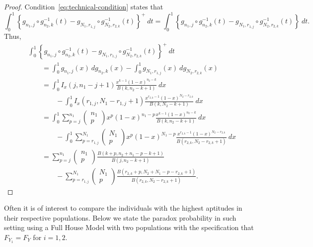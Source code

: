 \documentclass[12pt]{article}
\begin{document}
\begin{proof}
Condition~\eqref{eq:technical-condition} states that 
$$
\int_0^1 \left\{g_{n_1, j} \circ g_{n_2, k}^{-1}(t) - g_{N_1, r_{1,j}} \circ g_{N_2, r_{2,k}}^{-1}(t)\right\}^+\ dt = 
\int_0^1 \left\{g_{n_1, j} \circ g_{n_2, k}^{-1}(t) - g_{N_1, r_{1,j}} \circ g_{N_2, r_{2,k}}^{-1}(t)\right\}\ dt.
$$
Thus,
\begin{align*}	
&\int_0^1 \left\{g_{n_1, j} \circ g_{n_2, k}^{-1}(t) - g_{N_1, r_{1,j}} \circ g_{N_2, r_{2,k}}^{-1}(t)\right\}^+\ dt \\
	&\qquad= \int_0^1 g_{n_1, j}(x) \ dg_{n_2, k}(x)- \int_0^1g_{N_1, r_{1,j}}(x) \ dg_{N_2, r_{2,k}}(x)\\
	&\qquad= \int_0^1 I_x(j, n_1 -j+1) \frac{x^{k-1}(1-x)^{n_2-k}}{B(k, n_2-k+1)} \ dx \\ 
	&\qquad\qquad- \int_0^1 I_x(r_{1,j}, N_1-r_{1,j}+1) \frac{x^{r_{2,k}-1}(1-x)^{N_2-r_{2,k}}}{B(k, N_2-k+1)} \ dx\\
	&\qquad =\int_0^1 \sum_{p=j}^{n_1}\left(\begin{array}{l}
n_1 \\
p
\end{array}\right) x^p(1-x)^{n_1-p} \frac{x^{k-1}(1-x)^{n_2-k}}{B(k, n_2-k+1)} \ dx \\
&\qquad\qquad - \int_0^1 \sum_{p=r_{1,j}}^{N_1}\left(\begin{array}{l}
N_1 \\
p
\end{array}\right) x^p(1-x)^{N_1-p} \frac{x^{r_{2,k}-1}(1-x)^{N_2-r_{2,k}}}{B(r_{2,k}, N_2-r_{2,k}+1)} \ dx\\ 
&\qquad = \sum_{p=j}^{n_1}\left(\begin{array}{l}
n_1 \\
p
\end{array}\right)\frac{B(k+p, n_2+n_1-p-k+1)}{B(j, n_2-k+1)} \\ 
&\qquad\qquad - \sum_{p=r_{1,j}}^{N_1}\left(\begin{array}{l}
N_1 \\
p
\end{array}\right)\frac{B(r_{2,k}+p, N_2+N_1-p-r_{2,k}+1)}{B(r_{2,k}, N_2-r_{2,k}+1)}.
\end{align*}
\end{proof}


Often it is of interest to compare the individuals with the highest aptitudes in their respective populations. Below we state the paradox probability in such setting using a Full House Model with two populations with the specification that $F_{Y_1} = F_Y$ for $i=1,2$.
\end{document}
